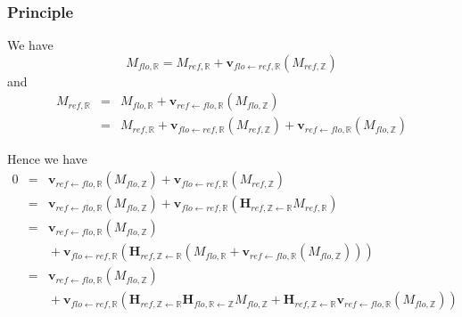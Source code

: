 \subsubsection{Principle}

We have 
\begin{displaymath}
M_{flo,\mathbb{R}} = 
M_{ref,\mathbb{R}} 
+ \mathbf{v}_{flo \leftarrow ref, \mathbb{R}}(M_{ref,\mathbb{Z}} )
\end{displaymath}
and 
\begin{eqnarray*}
M_{ref,\mathbb{R}} & = &
M_{flo,\mathbb{R}} 
+ \mathbf{v}_{ref \leftarrow flo, \mathbb{R}}(M_{flo,\mathbb{Z}} ) \\
& = &
M_{ref,\mathbb{R}} 
+ \mathbf{v}_{flo \leftarrow ref, \mathbb{R}}(M_{ref,\mathbb{Z}} )
+ \mathbf{v}_{ref \leftarrow flo, \mathbb{R}}(M_{flo,\mathbb{Z}} )
\end{eqnarray*}

Hence we have 
\begin{eqnarray*}
0 & = & 
\mathbf{v}_{ref \leftarrow flo, \mathbb{R}}(M_{flo,\mathbb{Z}} )
+
\mathbf{v}_{flo \leftarrow ref, \mathbb{R}}(M_{ref,\mathbb{Z}} ) \\
& = &
\mathbf{v}_{ref \leftarrow flo, \mathbb{R}}(M_{flo,\mathbb{Z}} )
+
\mathbf{v}_{flo \leftarrow ref, \mathbb{R}}(
\mathbf{H}_{ref,\mathbb{Z} \leftarrow \mathbb{R}} 
M_{ref,\mathbb{R}}
) \\
& = &
\mathbf{v}_{ref \leftarrow flo, \mathbb{R}}(M_{flo,\mathbb{Z}} )
 \\
& & \mbox{} + 
\mathbf{v}_{flo \leftarrow ref, \mathbb{R}}(
\mathbf{H}_{ref,\mathbb{Z} \leftarrow \mathbb{R}} 
( 
M_{flo,\mathbb{R}} + 
\mathbf{v}_{ref \leftarrow flo, \mathbb{R}}(M_{flo,\mathbb{Z}} )
)
) \\
& = &
\mathbf{v}_{ref \leftarrow flo, \mathbb{R}}(M_{flo,\mathbb{Z}} )
\\
& & \mbox{} +
\mathbf{v}_{flo \leftarrow ref, \mathbb{R}}(
\mathbf{H}_{ref,\mathbb{Z} \leftarrow \mathbb{R}} 
\mathbf{H}_{flo,\mathbb{R} \leftarrow \mathbb{Z}} 
M_{flo,\mathbb{Z}}
+ 
\mathbf{H}_{ref,\mathbb{Z} \leftarrow \mathbb{R}}
\mathbf{v}_{ref \leftarrow flo, \mathbb{R}}(M_{flo,\mathbb{Z}} )
)
\end{eqnarray*}


